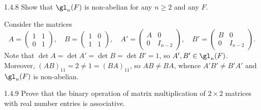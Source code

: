 \begin{exercise}{1.4.8}
    Show that $\gl_n(F)$ is non-abelian for any $n \geq 2$ and any $F$.
\end{exercise}

\begin{sol}
    Consider the matrices
    \[
        A = 
        \begin{pmatrix}
            1 & 1 \\
            0 & 1
        \end{pmatrix}, \quad
        B = 
        \begin{pmatrix}
            1 & 0 \\
            1 & 1
        \end{pmatrix}, \quad
        A' = 
        \begin{pmatrix}
            A & 0 \\
            0 & I_{n-2}
        \end{pmatrix}, \quad
        B' = 
        \begin{pmatrix}
            B & 0 \\
            0 & I_{n-2}
        \end{pmatrix}.
    \]
    Note that $\det A = \det A' = \det B = \det B' = 1$, so $A', B' \in \gl_n(F)$.
    Moreover, $(AB)_{11} = 2 \neq 1 = (BA)_{11}$, so $AB \neq BA$, whence $A'B' \neq B'A'$ and $\gl_n(F)$ is non-abelian.
\end{sol}

\begin{exercise}{1.4.9}
    Prove that the binary operation of matrix multiplication of $2 \times 2$ matrices with real number entries is associative.
\end{exercise}

